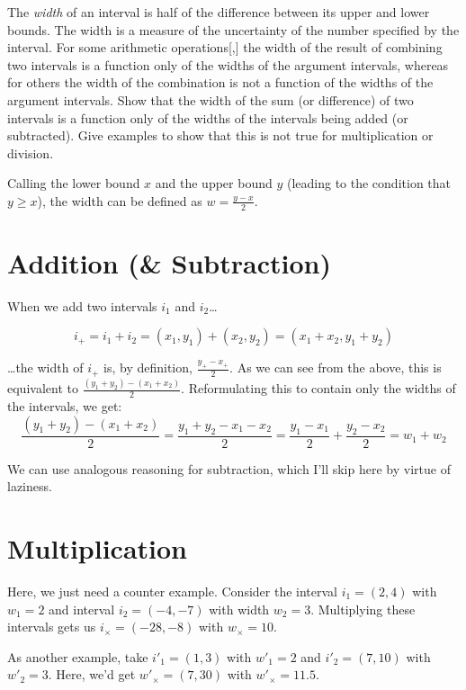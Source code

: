 \documentclass{../../sicp}
\date{February 3, 2025}
\begin{document}
\maketitle

\begin{displayquote}
	The \emph{width} of an interval is half of the difference between its upper and lower bounds. The width is a measure of the uncertainty of the number specified by the interval. For some arithmetic operations[,] the width of the result of combining two intervals is a function only of the widths of the argument intervals, whereas for others the width of the combination is not a function of the widths of the argument intervals. Show that the width of the sum (or difference) of two intervals is a function only of the widths of the intervals being added (or subtracted). Give examples to show that this is not true for multiplication or division.
\end{displayquote}

Calling the lower bound $x$ and the upper bound $y$ (leading to the condition that $y \geq x$), the width can be defined as $w = \frac{y - x}{2}$.

\section*{Addition (\& Subtraction)}
When we add two intervals $i_1$ and $i_2$\dots

\[
	i_+ = i_1 + i_2 = (x_1, y_1) + (x_2, y_2) = (x_1 + x_2, y_1 + y_2)
\]

\dots{}the width of $i_+$ is, by definition, $\frac{y_+ - x_+}{2}$.
As we can see from the above, this is equivalent to $\frac{(y_1 + y_2) - (x_1 + x_2)}{2}$.
Reformulating this to contain only the widths of the intervals, we get:
\[
	\frac{(y_1 + y_2) - (x_1 + x_2)}{2} = \frac{y_1 + y_2 - x_1 - x_2}{2} = \frac{y_1 - x_1}{2} + \frac{y_2 - x_2}{2} = w_1 + w_2
\]

We can use analogous reasoning for subtraction, which I'll skip here by virtue of laziness.

\section*{Multiplication}
Here, we just need a counter example.
Consider the interval $i_1 = (2, 4)$ with $w_1 = 2$ and interval $i_2 = (-4, -7)$ with width $w_2 = 3$.
Multiplying these intervals gets us $i_\times = (-28, -8)$ with $w_\times = 10$.

As another example, take $i'_1 = (1,3)$ with $w'_1 = 2$ and $i'_2 = (7,10)$ with $w'_2 = 3$.
Here, we'd get $w'_\times = (7, 30)$ with $w'_\times = 11.5$.
\end{document}
